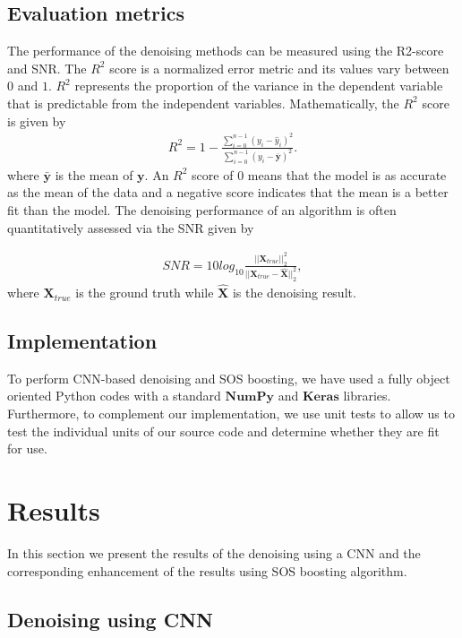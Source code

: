 \documentclass[a4paper]{article}
\begin{document}
\subsection{Evaluation metrics}
The performance of the denoising methods can be measured using the R2-score and SNR. The $R^2$ score is a normalized error metric and its values vary between $0$ and $1$. $R^2$ represents the proportion of the variance in the dependent variable that is predictable from the independent variables. Mathematically, the $R^2$ score is given by
\begin{align}
    R^2 = 1 - \frac{\sum_{i=0}^{n - 1} (y_i - \hat{y}_i)^2}{\sum_{i=0}^{n - 1} (y_i - \bar{\mathbf{y}})^2}.
    \label{eq:R2}
\end{align}
where $\bar{\mathbf{y}}$ is the mean of $\mathbf{y}$. An $R^2$ score of $0$ means that the model is as accurate as the mean of the data and a negative score indicates that the mean is a better fit than the model.  The denoising performance of an algorithm is often quantitatively assessed via the SNR given by

\begin{align}
    SNR = 10log_{10}\frac{||\mathbf{X}_{true}||_2^2}{||\mathbf{X}_{true}-\mathbf{\hat{X}}||_2^2} ,
    \label{eq:SNR}
\end{align}
where $\mathbf{X}_{true}$ is the ground truth while $\mathbf{\hat{X}}$ is the denoising result.

\subsection{Implementation}

To perform CNN-based denoising and SOS boosting, we have used a fully object oriented Python codes with a standard $\mathbf{NumPy}$ and $\mathbf{Keras}$ libraries. Furthermore, to complement our implementation, we use unit tests to allow us to test the individual units of our source code and determine whether they are fit for use.  

\section{Results}
In this section we present the results of the denoising using a CNN and the corresponding enhancement of the results using SOS boosting algorithm.

\subsection{Denoising using CNN}
\end{document}
